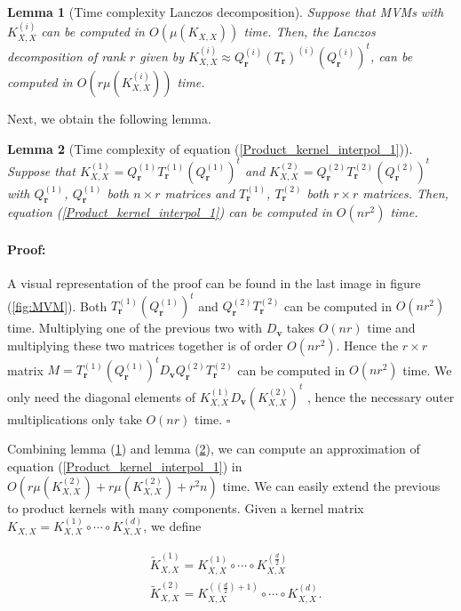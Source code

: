 \documentclass[12pt,a4paper,oneside]{book}
\newtheorem{Lemma}{Lemma}
\newenvironment{proof}{\paragraph{Proof:}}{\hfill$\square$}
\begin{document}
\begin{Lemma}[Time complexity Lanczos decomposition] \label{lemma_time_complexity_lancos_decomposition}
Suppose that MVMs with $K_{X,X}^{(i)}$ can be computed in $O(\mu(K_{X,X}))$ time. Then, the Lanczos decomposition of rank $r$ given by $K_{X,X}^{(i)} \approx Q_{\bm{r}}^{(i)}  (T_{\bm{r}})^{(i)} (Q_{\bm{r}}^{(i)})^{t} $, can be computed in $O(r\mu(K_{X,X}^{(i)}))$ time.
\end{Lemma}

Next, we obtain the following lemma.

\begin{Lemma}[Time complexity of equation  (\ref{Product_kernel_interpol_1})]\label{lemma_time_complexity_matrix_mult}
Suppose that $K_{X,X}^{(1)} = Q_{\bm{r}}^{(1)}  T_{\bm{r}}^{(1)} (Q_{\bm{r}}^{(1)})^{t}$ and $K_{X,X}^{(2)} = Q_{\bm{r}}^{(2)}  T_{\bm{r}}^{(2)} (Q_{\bm{r}}^{(2)})^{t}$ with $Q_{\bm{r}}^{(1)}$,  $Q_{\bm{r}}^{(1)}$ both $n \times r$ matrices and $T_{\bm{r}}^{(1)}$, $T_{\bm{r}}^{(2)}$ both $r \times r$ matrices. Then, equation  (\ref{Product_kernel_interpol_1}) can be computed in $O(nr^2)$ time.
\end{Lemma}

\begin{proof}
A visual representation of the proof can be found in the last image in figure (\ref{fig:MVM}). Both $T_{\bm{r}}^{(1)} (Q_{\bm{r}}^{(1)})^{t}$ and $ Q_{\bm{r}}^{(2)}  T_{\bm{r}}^{(2)}$ can be computed in $O(n r^2)$ time. Multiplying one of the previous two with $D_{\bm{v}}$ takes $O(nr)$ time and multiplying these two matrices together is of order $O(n r^2)$. Hence the $r \times r$ matrix $M = T_{\bm{r}}^{(1)} (Q_{\bm{r}}^{(1)})^{t} D_{\bm{v}} Q_{\bm{r}}^{(2)}  T_{\bm{r}}^{(2)}$ can be computed in $O(n r^2)$ time. We only need the diagonal elements of $K_{X,X}^{(1)} D_{\bm{v}} (K_{X,X}^{(2)})^t$ , hence the necessary outer multiplications only take $O(nr)$ time.  
\end{proof}

Combining lemma (\ref{lemma_time_complexity_lancos_decomposition}) and lemma (\ref{lemma_time_complexity_matrix_mult}), we can compute an approximation of equation  (\ref{Product_kernel_interpol_1}) in $O\left(r \mu(K_{X,X}^{(2)}) +r \mu(K_{X,X}^{(2)}) + r^2n \right)$ time. We can easily extend the previous to product kernels with many components. Given a kernel matrix $ K_{X,X} = K_{X,X}^{(1)} \circ \cdots \circ K_{X,X}^{(d)}$, we define 

\begin{align}
&\tilde{K}_{X,X}^{(1)} = K_{X,X}^{(1)} \circ \cdots \circ K_{X,X}^{\left(\frac{d}{2}\right)} \nonumber \\
&\tilde{K}_{X,X}^{(2)} = K_{X,X}^{\left(\left(\frac{d}{2}\right) + 1\right)} \circ \cdots \circ K_{X,X}^{(d)}. 
\end{align}
\end{document}

